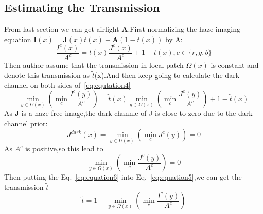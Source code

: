 \documentclass[10pt,twocolumn,letterpaper]{article}
\begin{document}
\subsection{Estimating the Transmission}
From last section we can get airlight \textbf{A}.First normalizing the haze imaging equation $\textbf{I}(x) = \textbf{J}(x)t(x)+\textbf{A}(1-t(x))$ by A:
\begin{equation}
\frac{I^{c}(x)}{A^{c}} = t(x)\frac{J^{c}(x)}{A^{c}} + 1 - t(x),c \in {\{r,g,b\}} \label{eq:equtation4}
\end{equation}
Then author assume that the transmission in local patch $\Omega {(x)}$ is constant and denote this transmission as $\widetilde{t}$(x).And then keep going to calculate the dark channel on both sides of~\ref{eq:equtation4}
\begin{equation}
\min_{y\in {\Omega (x)}}\!\!\!\left(\min_{c}\frac{I^{c}(y)}{A^{c}} \right) \!\!=\!\! \widetilde{t}(x)\!\min_{\!y\in{\Omega{(x)}}}\!\left(\min_{c}\frac{J^{c}(y)}{A^{c}} \right)\!\!\! +\!1\!-\!\widetilde{t}{(x)}
\label{eq:equation5}
\end{equation}
As \textbf{J} is a haze-free image,the dark channle of J is close to zero due to the dark channel prior:
\begin{equation}
J^{dark}(x) = \min_{y\in{\Omega{(x)}}}\left(\min_{c}J^{c}(y)\right) = 0
\end{equation}
As $A^{c}$  is positive,so this lead to
\begin{equation}
\min_{y\in{\Omega{(x)}}}\left(\min_{c}\frac{J^{c}(y)}{A^{c}} \right) = 0 \label{eq:equation6}
\end{equation}
Then putting the Eq.~\ref{eq:equation6} into Eq.~\ref{eq:equation5},we can get the transmission $\widetilde{t}$ 
\begin{equation}
\widetilde{t} = 1- \min_{y\in{\Omega{(x)}}}\left(\min_{c}\frac{I^{c}(y)}{A^{c}} \right)
\end{equation}


{\small


}
\end{document}
